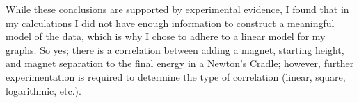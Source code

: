 \documentclass[aip,jmp,amsmath,amssymb,reprint,author-numerical]{revtex4-1}
\begin{document}
        While these conclusions are supported by experimental evidence, I found that in my calculations
        I did not have enough information to construct a meaningful model of the data, which is why I
        chose to adhere to a linear model for my graphs. So yes; there is a correlation between adding
        a magnet, starting height, and magnet separation to the final energy in a Newton's Cradle;
        however, further experimentation is required to determine the type of correlation (linear,
        square, logarithmic, etc.).
\end{document}
